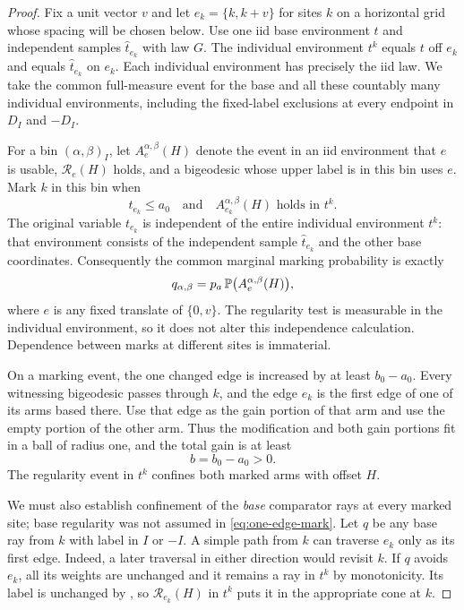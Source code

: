 \begin{proof}
Fix a unit vector $v$ and let $e_k=\{k,k+v\}$ for sites $k$ on a
horizontal grid whose spacing will be chosen below.  Use one iid base
environment $t$ and independent samples $\widehat t_{e_k}$ with law
$G$.  The individual environment $t^k$ equals $t$ off $e_k$ and equals
$\widehat t_{e_k}$ on $e_k$.  Each individual environment has precisely
the iid law.  We take the common full-measure event for the base and all
these countably many individual environments, including the fixed-label
exclusions at every endpoint in $D_I$ and $-D_I$.

For a bin $(\alpha,\beta)_I$, let $A_e^{\alpha,\beta}(H)$ denote the
event in an iid environment that $e$ is usable, $\mathcal R_e(H)$ holds,
and a bigeodesic whose upper label is in this bin uses $e$.  Mark $k$ in
this bin when
\begin{equation}\label{eq:one-edge-mark}
 t_{e_k}\le a_0
 \quad\text{and}\quad
 A_{e_k}^{\alpha,\beta}(H)\text{ holds in }t^k.
\end{equation}
The original variable $t_{e_k}$ is independent of the entire individual
environment $t^k$: that environment consists of the independent sample
$\widehat t_{e_k}$ and the other base coordinates.  Consequently the
common marginal marking probability is exactly
\begin{equation}\label{eq:one-edge-mark-probability}
 q_{\alpha,\beta}
   =p_a\,\mathbb P\bigl(A_e^{\alpha,\beta}(H)\bigr),
\end{equation}
where $e$ is any fixed translate of $\{0,v\}$.
The regularity test is measurable in the individual environment, so it
does not alter this independence calculation.  Dependence between marks
at different sites is immaterial.

On a marking event, the one changed edge is increased by at least
$b_0-a_0$.  Every witnessing bigeodesic passes through $k$, and the edge
$e_k$ is the first edge of one of its arms based there.  Use that edge as
the gain portion of that arm and use the empty portion of the other arm.
Thus the modification and both gain portions fit in a ball of radius
one, and the total gain is at least
\[
 b=b_0-a_0>0.
\]
The regularity event in $t^k$ confines both marked arms with offset $H$.

We must also establish confinement of the \emph{base} comparator rays at
every marked site; base regularity was not assumed in
\eqref{eq:one-edge-mark}.  Let $q$ be any base ray from $k$ with label in
$I$ or $-I$.  A simple path from $k$ can traverse $e_k$ only as its first
edge.  Indeed, a later traversal in either direction would revisit $k$.
If $q$ avoids $e_k$, all its weights are unchanged and it remains a ray
in $t^k$ by monotonicity.  Its label is unchanged by
, so $\mathcal R_{e_k}(H)$ in $t^k$ puts it in
the appropriate cone at $k$.


\end{proof}
